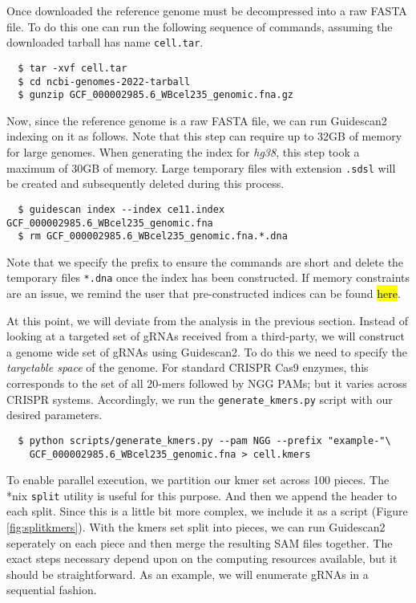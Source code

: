 \documentclass[11pt]{article}
\begin{document}
Once downloaded the reference genome must be decompressed into a raw
FASTA file.  To do this one can run the following sequence of
commands, assuming the downloaded tarball has name \texttt{cell.tar}.

\begin{verbatim}
  $ tar -xvf cell.tar
  $ cd ncbi-genomes-2022-tarball
  $ gunzip GCF_000002985.6_WBcel235_genomic.fna.gz
\end{verbatim}

Now, since the reference genome is a raw FASTA file, we can run
Guidescan2 indexing on it as follows. Note that this step can require
up to 32GB of memory for large genomes. When generating the index for
\textit{hg38}, this step took a maximum of 30GB of memory. Large
temporary files with extension \texttt{.sdsl} will be created and
subsequently deleted during this process.

\begin{verbatim}
  $ guidescan index --index ce11.index GCF_000002985.6_WBcel235_genomic.fna
  $ rm GCF_000002985.6_WBcel235_genomic.fna.*.dna
\end{verbatim}

Note that we specify the prefix to ensure the commands are short and
delete the temporary files \texttt{*.dna} once the index has been
constructed. If memory constraints are an issue, we remind the user
that pre-constructed indices can be found \hl{here}.

At this point, we will deviate from the analysis in the previous
section. Instead of looking at a targeted set of gRNAs received from a
third-party, we will construct a genome wide set of gRNAs using
Guidescan2. To do this we need to specify the {\it targetable space}
of the genome. For standard CRISPR Cas9 enzymes, this corresponds to
the set of all 20-mers followed by NGG PAMs; but it varies across
CRISPR systems. Accordingly, we run the \texttt{generate\_kmers.py}
script with our desired parameters.

\begin{verbatim}
  $ python scripts/generate_kmers.py --pam NGG --prefix "example-"\
    GCF_000002985.6_WBcel235_genomic.fna > cell.kmers
\end{verbatim}

To enable parallel execution, we partition our kmer set across 100
pieces. The *nix \texttt{split} utility is useful for this
purpose. And then we append the header to each split. Since this is a
little bit more complex, we include it as a script (Figure
\ref{fig:splitkmers}). With the kmers set split into pieces, we can
run Guidescan2 seperately on each piece and then merge the resulting
SAM files together. The exact steps necessary depend upon on the
computing resources available, but it should be straightforward. As an
example, we will enumerate gRNAs in a sequential fashion.
\end{document}
